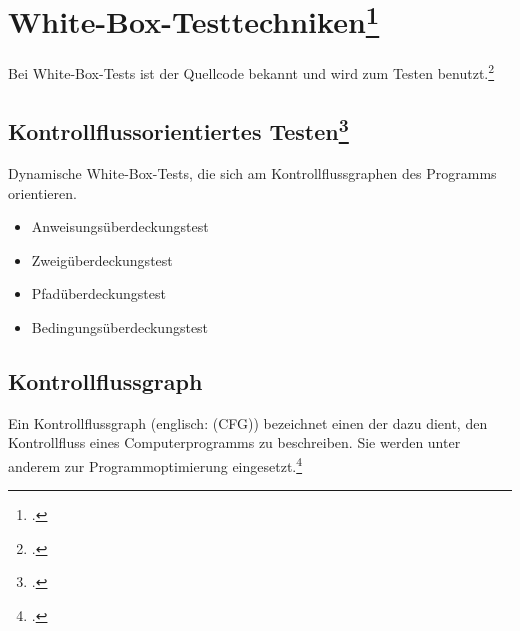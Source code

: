\documentclass{bschlangaul-theorie}
\begin{document}
%

\section{White-Box-Testtechniken\footcite[Seite 199-246]{hoffmann:software}}

\begin{bQuellen}
\item \cite{wiki:white-box-test}
\item \cite[Seite 199-246]{hoffmann:software}
\end{bQuellen}

Bei White-Box-Tests ist der Quellcode bekannt und wird zum Testen
benutzt.\footcite[Seite 32]{sosy:fs:5}

%

\subsection{Kontrollflussorientiertes Testen\footcite[Seite 34]{sosy:fs:5}}

\begin{bQuellen}
\item \cite{wiki:kontrollfluss-test}
\item \cite[Kapitel 8.6.3 „Methoden zur Testfallermittlung“, Seite 251-252]{schneider}
\end{bQuellen}

Dynamische White-Box-Tests, die sich am Kontrollflussgraphen des
Programms orientieren.

\begin{itemize}
\item Anweisungsüberdeckungstest
\item Zweigüberdeckungstest
\item Pfadüberdeckungstest
\item Bedingungsüberdeckungstest
\end{itemize}

%

\subsection{Kontrollflussgraph}

Ein Kontrollflussgraph (englisch:  (CFG))
bezeichnet einen  der dazu dient, den
Kontrollfluss eines Computerprogramms zu beschreiben. Sie werden unter
anderem zur Programmoptimierung
eingesetzt.\footcite{wiki:kontrollflussgraph}
\end{document}

